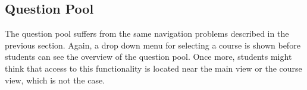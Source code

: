 \subsection{Question Pool}

The question pool suffers from the same navigation problems described in the previous section. Again, a drop down menu for selecting a course is shown before students can see the overview of the question pool. Once more, students might think that access to this functionality is located near the main view or the course view, which is not the case.



